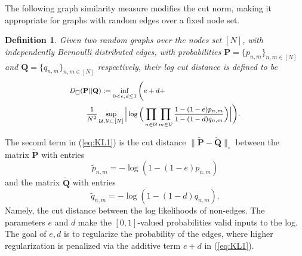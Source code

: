 \documentclass[letterpaper]{article} %
\newtheorem{definition}[theorem]{Definition}
\begin{document}
The following graph similarity measure modifies the cut norm, making it appropriate for graphs with random edges over a fixed node set.
\begin{definition}
\label{def:KL1}
Given two random graphs over the nodes set $[N]$, with independently Bernoulli distributed edges, with probabilities $\mathbf{P}=\{p_{n,m}\}_{n,m\in[N]}$ and $\mathbf{Q}=\{q_{n,m}\}_{n,m\in[N]}$ respectively, their \emph{log cut distance} is defined to be 
\begin{equation}
\footnotesize
    \begin{split}
       & D_{\square}(\mathbf{P} || \mathbf{Q}):=  \inf_{0< e,d\leq 1} \Bigg( e+d+ \\
       &  \quad \quad \  \frac{1}{N^2}\sup_{\mathcal{U},\mathcal{V}\subset[N]}\Big|\log\Big(\prod_{n\in \mathcal{U}}\prod_{m\in \mathcal{V}}
\frac{1-(1-e)p_{n,m}}{1-(1-d)q_{n,m}}\Big)\Big|\Bigg).
    \end{split}
    \label{eq:KL1}
\end{equation}
\end{definition}
The second term in (\ref{eq:KL1}) is the cut distance $\| \tilde{\mathbf{P}}-\tilde{\mathbf{Q}}\|_{\square}$ between the matrix $\tilde{\mathbf{P}}$ with entries 
\[\tilde{p}_{n,m}=-\log(1-(1-e)p_{n,m})\]
and the matrix $\tilde{\mathbf{Q}}$
 with entries 
 \[\tilde{q}_{n,m}=-\log(1-(1-d)q_{n,m}).\] Namely, the cut distance between the log likelihoods of non-edges. The parameters $e$ and $d$ make the $[0,1]$-valued probabilities valid inputs to the log. The goal of $e,d$ is to regularize the probability of the edges, where higher regularization is penalized via the additive term $e+d$ in (\ref{eq:KL1}).
\end{document}
